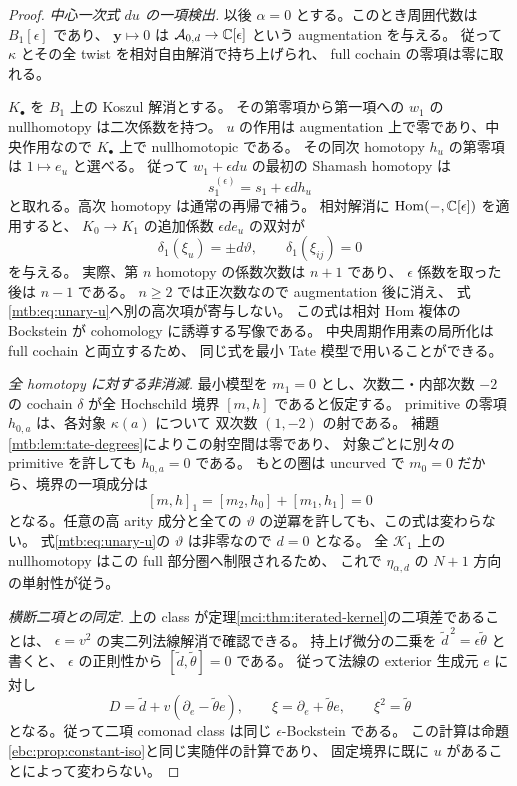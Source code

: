 \begin{proof}
\emph{中心一次式 $du$ の一項検出.}
以後 $\alpha=0$ とする。このとき周囲代数は $B_1[\epsilon]$ であり、
$\mathbf y\mapsto0$ は
$\mathcal A_{0,d}\to\mathbb C[\epsilon]$ という augmentation を与える。
従って $\kappa$ とその全 twist を相対自由解消で持ち上げられ、
full cochain の零項は零に取れる。

$K_\bullet$ を $B_1$ 上の Koszul 解消とする。
その第零項から第一項への $w_1$ の nullhomotopy は二次係数を持つ。
$u$ の作用は augmentation 上で零であり、中央作用なので
$K_\bullet$ 上で nullhomotopic である。
その同次 homotopy $h_u$ の第零項は $1\mapsto e_u$ と選べる。
従って $w_1+\epsilon du$ の最初の Shamash homotopy は
\[
                    s_1^{(\epsilon)}=s_1+\epsilon d h_u
\]
と取れる。高次 homotopy は通常の再帰で補う。
相対解消に $\operatorname{Hom}(-,\mathbb C[\epsilon])$ を適用すると、
$K_0\to K_1$ の追加係数 $\epsilon d e_u$ の双対が
\begin{equation}\label{mtb:eq:unary-u}
 \delta_1(\xi_u)=\pm d\vartheta,\qquad
 \delta_1(\xi_{ij})=0
\end{equation}
を与える。
実際、第 $n$ homotopy の係数次数は $n+1$ であり、
$\epsilon$ 係数を取った後は $n-1$ である。
$n\ge2$ では正次数なので augmentation 後に消え、
式\eqref{mtb:eq:unary-u}へ別の高次項が寄与しない。
この式は相対 Hom 複体の Bockstein が cohomology に誘導する写像である。
中央周期作用素の局所化は full cochain と両立するため、
同じ式を最小 Tate 模型で用いることができる。

\emph{全 homotopy に対する非消滅.}
最小模型を $m_1=0$ とし、次数二・内部次数 $-2$ の cochain
$\delta$ が全 Hochschild 境界 $[m,h]$ であると仮定する。
primitive の零項 $h_{0,a}$ は、各対象 $\kappa(a)$ について
双次数 $(1,-2)$ の射である。
補題\ref{mtb:lem:tate-degrees}によりこの射空間は零であり、
対象ごとに別々の primitive を許しても $h_{0,a}=0$ である。
もとの圏は uncurved で $m_0=0$ だから、境界の一項成分は
\[
                   [m,h]_1=[m_2,h_0]+[m_1,h_1]=0
\]
となる。任意の高 arity 成分と全ての $\vartheta$ の逆冪を許しても、この式は変わらない。
式\eqref{mtb:eq:unary-u}の $\vartheta$ は非零なので $d=0$ となる。
全 $\mathcal K_1$ 上の nullhomotopy はこの full 部分圏へ制限されるため、
これで $\eta_{\alpha,d}$ の $N+1$ 方向の単射性が従う。

\emph{横断二項との同定.}
上の class が定理\ref{mci:thm:iterated-kernel}の二項差であることは、
$\epsilon=v^2$ の実二列法線解消で確認できる。
持上げ微分の二乗を $\widetilde d^{\,2}=\epsilon\widetilde\theta$ と書くと、
$\epsilon$ の正則性から $[\widetilde d,\widetilde\theta]=0$ である。
従って法線の exterior 生成元 $e$ に対し
\[
 D=\widetilde d+v(\partial_e-\widetilde\theta e),\qquad
 \xi=\partial_e+\widetilde\theta e,\qquad
                         \xi^2=\widetilde\theta
\]
となる。従って二項 comonad class は同じ $\epsilon$-Bockstein である。
この計算は命題\ref{ebc:prop:constant-iso}と同じ実随伴の計算であり、
固定境界に既に $u$ があることによって変わらない。


\end{proof}
